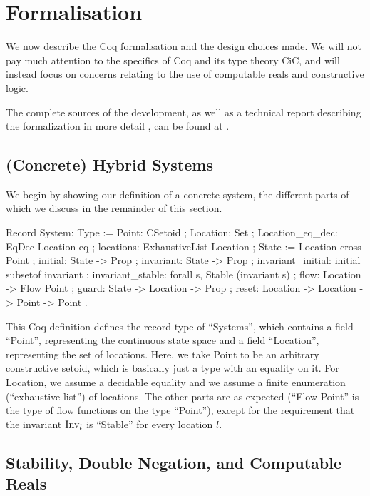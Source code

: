 \documentclass[runningheads]{llncs}
\newcommand{\Inv}{{\rm Inv}}
\begin{document}
\section{Formalisation}
We now describe the Coq formalisation and the design choices made.
We will not pay much attention to the specifics of Coq and its type theory CiC, and will instead focus on concerns relating to the use of computable reals and constructive logic.

The complete sources of the development, as well as a technical report describing the formalization in more detail \cite{hybrid-techreport}, can be found at .

\subsection{(Concrete) Hybrid Systems}
\label{concrete}

We begin by showing our definition of a concrete system, the different
parts of which we discuss in the remainder of this section.
\begin{code}
Record System: Type :=
  { Point: CSetoid
  ; Location: Set
  ; Location_eq_dec: EqDec Location eq
  ; locations: ExhaustiveList Location
  ; State :=  Location cross Point
  ; initial: State -> Prop
  ; invariant: State -> Prop
  ; invariant_initial: initial subsetof invariant
  ; invariant_stable: forall s, Stable (invariant s)
  ; flow: Location -> Flow Point
  ; guard: State -> Location -> Prop
  ; reset: Location -> Location -> Point -> Point  }.
\end{code}
This Coq definition defines the record type of ``Systems'', which
contains a field ``Point'', representing the continuous state space
and a field ``Location'', representing the set of locations. Here, we
take Point to be an arbitrary constructive setoid, which is basically
just a type with an equality on it. For Location, we assume a
decidable equality and we assume a finite enumeration (``exhaustive
list'') of locations. The other parts are as expected (``Flow Point''
is the type of flow functions on the type ``Point''), except for the
requirement that the invariant $\Inv_l$ is ``Stable'' for every
location $l$.

\subsection{Stability, Double Negation, and Computable Reals}
\label{dn}
\end{document}
